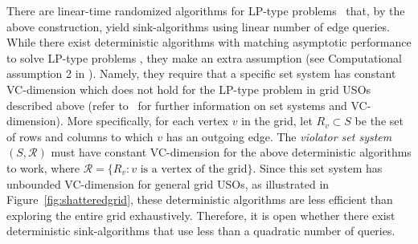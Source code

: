 \documentclass[runningheads,a4paper]{llncs}
\newcommand{\sinkalgs}{sink-algorithms\xspace}
\begin{document}
There are linear-time randomized algorithms for LP-type problems~\cite{MatousekSW96} that, by the above construction, yield \sinkalgs using linear number of edge queries. 
While there exist deterministic algorithms with matching asymptotic performance to solve LP-type problems \cite{chan16,ChazelleM96}, they make an extra assumption  
(see Computational assumption 2 in \cite{ChazelleM96}). 
Namely, they require that a specific set system has constant VC-dimension which does not hold for the LP-type problem in grid USOs described above (refer to~\cite{matouvsek2002lectures} for further information on set systems and VC-dimension). More specifically, for each vertex $v$ in the grid, let $R_v\subset S$ be the set of rows and columns to which $v$ has an outgoing edge. 
The \emph{violator set system} $(S, \mathcal R)$ must have constant VC-dimension for the above deterministic algorithms to work, where $\mathcal R = \{R_v : v\text{ is a vertex of the grid}\}$. 
Since this set system has unbounded VC-dimension for general grid USOs, as illustrated in Figure~\ref{fig:shatteredgrid}, these deterministic algorithms are less efficient than exploring the entire grid exhaustively. 
Therefore, it is open whether there exist deterministic \sinkalgs that use less than a quadratic number of queries. 
\end{document}
